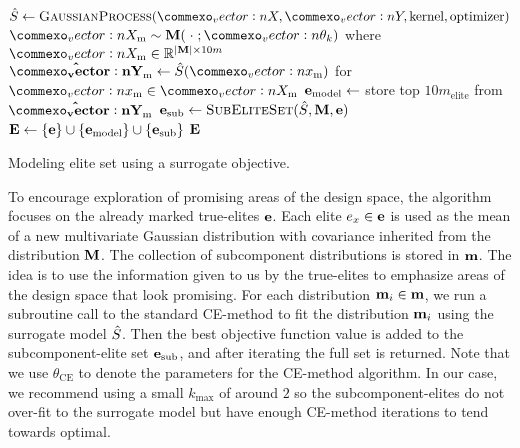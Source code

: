 \begin{algorithm}[ht]
  \begin{algorithmic}
    \State $\surrogate \leftarrow \textproc{GaussianProcess}(\mat{X}, \mat{Y}, \text{kernel}, \text{optimizer})$  %
    \State $\mat{X}_\text{m} \sim \M(\;\cdot\;; \vec{\theta}_k)$ where $\mat{X}_\text{m} \in \R^{|\M| \times {10m}}$ 
    \State $\mathbf{\hat{\mat{Y}}}_\text{m} \leftarrow \surrogate(\vec{x}_\text{m})$ for $\vec{x}_\text{m} \in \mat{X}_\text{m}$ 
    \State $\mathbf{e}_\text{model} \leftarrow$ store top $10m_\text{elite}$ from $\mathbf{\hat{\mat{Y}}}_\text{m}$ 
    \State $\e_\text{sub} \leftarrow \textproc{SubEliteSet}(\surrogate, \M, \e)$ 
    \State $\mathbf{E} \leftarrow \{ \mathbf{e} \} \cup \{ \mathbf{e}_\text{model} \} \cup \{ \mathbf{e}_\text{sub} \}$ 
    \State \Return $\mathbf{E}$
  \EndFunction
  \end{algorithmic}
  \caption{\label{alg:model_elite_set} Modeling elite set using a surrogate objective.}
\end{algorithm}

To encourage exploration of promising areas of the design space, the algorithm  focuses on the already marked true-elites $\mathbf{e}$.
Each elite $e_x \in \mathbf{e}$ is used as the mean of a new multivariate Gaussian distribution with covariance inherited from the distribution $\mathbf{M}$.
The collection of subcomponent distributions is stored in $\mathbf{m}$.
The idea is to use the information given to us by the true-elites to emphasize areas of the design space that look promising.
For each distribution $\mathbf{m}_i \in \mathbf{m}$, we run a subroutine call to the standard CE-method to fit the distribution $\mathbf{m}_i$ using the surrogate model $\hat{S}$. 
Then the best objective function value is added to the subcomponent-elite set $\mathbf{e}_\text{sub}$, and after iterating the full set is returned.
Note that we use $\theta_\text{CE}$ to denote the parameters for the CE-method algorithm.
In our case, we recommend using a small $k_\text{max}$ of around $2$ so the subcomponent-elites do not over-fit to the surrogate model but have enough CE-method iterations to tend towards optimal.

